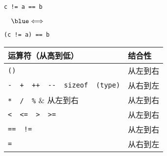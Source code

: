 \begin{frame}[fragile]
 

\begin{minipage}{.4\textwidth}
\begin{lstlisting}
c != a == b
\end{lstlisting}
\end{minipage}$~~~\blue\Longleftrightarrow~~~$
\begin{minipage}{.4\textwidth}
\begin{lstlisting}
(c != a) == b
\end{lstlisting}
\end{minipage}

\end{frame}


\begin{frame}[fragile]
\begin{table}
\centering
\begin{tabular}{p{6cm}|p{3cm}}\hline
运算符（从高到低） & 结合性 \\\hline\hline
\lstinline|()| & 从左到右\\[0.1in]
\lstinline|-  +  ++  --  sizeof  (type)|
& 从右到左\\[0.1in]
\lstinline|*  /  %| & 从左到右 \\[0.1in]
\lstinline|+ -| & 从左到右 \\[0.1in]
\lstinline|<  <=  >  >=| & 从左到右\\[0.1in]
\lstinline|==  !=| & 从左到右\\[0.1in]
\lstinline|=| & 从右到左\\\hline
\end{tabular}
\end{table}

\end{frame}
